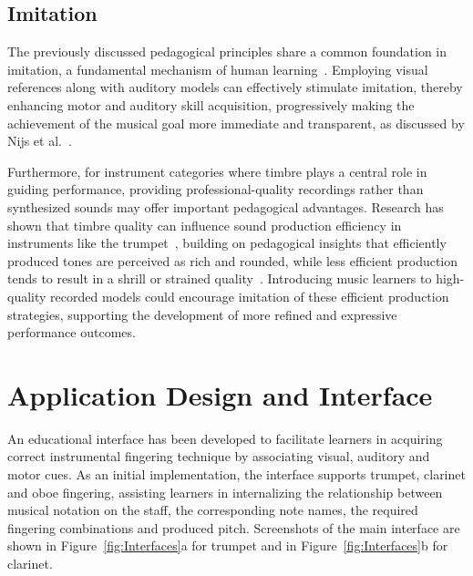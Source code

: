 \documentclass[runningheads]{llncs}
\begin{document}
\subsection{Imitation}
\label{sec:Imitation}

The previously discussed pedagogical principles share a common foundation in imitation, a fundamental mechanism of human learning~\cite{Rizzolatti04}. Employing visual references along with auditory models can effectively stimulate imitation, thereby enhancing motor and auditory skill acquisition, progressively making the achievement of the musical goal more immediate and transparent, as discussed by Nijs et al.~\cite{Nijs13}.

Furthermore, for instrument categories where timbre plays a central role in guiding performance, providing professional-quality recordings rather than synthesized sounds may offer important pedagogical advantages. Research has shown that timbre quality can influence sound production efficiency in instruments like the trumpet~\cite{AcquilinoISMIR}, building on pedagogical insights that efficiently produced tones are perceived as rich and rounded, while less efficient production tends to result in a shrill or strained quality~\cite{Jacobs06,Steen07}. Introducing music learners to high-quality recorded models could encourage imitation of these efficient production strategies, supporting the development of more refined and expressive performance outcomes.


\iffalse
\section{Application Design and Interface}\label{sec:legacy-technology}

An educational interface has been developed to facilitate learners in acquiring correct instrumental fingering technique by associating visual, auditory and motor cues. As an initial implementation, the interface supports trumpet, clarinet and oboe fingering, assisting learners in internalizing the relationship between musical notation on the staff, the corresponding note names, the required fingering combinations and produced pitch. Screenshots of the main interface are shown in Figure~\ref{fig:Interfaces}a for trumpet and in Figure~\ref{fig:Interfaces}b for clarinet.
\end{document}
